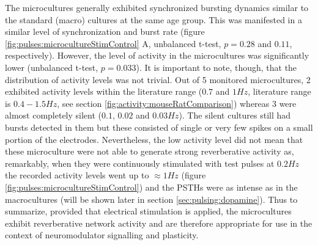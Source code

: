    The microcultures generally exhibited synchronized bursting dynamics similar to the standard (macro) cultures at the same age group. This was manifested in a similar level of synchronization and burst rate (figure \ref{fig:pulses:microcultureStimControl} A, unbalanced t-test, \(p=0.28\) and \(0.11\), respectively). However, the level of activity in the microcultures was significantly lower (unbalanced t-test, \(p=0.033\)). It is important to note, though, that the distribution of activity levels was not trivial. Out of 5 monitored microcultures, 2 exhibited activity levels within the literature range (\(0.7\) and \(1 Hz\), literature range is \(0.4-1.5Hz\), see section \ref{fig:activity:mouseRatComparison}) whereas 3 were almost completely silent (\(0.1\), \(0.02\) and \(0.03Hz\)). The silent cultures still had bursts detected in them but these consisted of single or very few spikes on a small portion of the electrodes. Nevertheless, the low activity level did not mean that these microculture were not able to generate strong reverberative activity as, remarkably, when they were continuously stimulated with test pulses at \(0.2Hz\) the recorded activity levels went up to \(\approx 1Hz\) (figure \ref{fig:pulses:microcultureStimControl}) and the PSTHs were as intense as in the macrocultures (will be shown later in section \ref{sec:pulsing:dopamine}). Thus to summarize, provided that electrical stimulation is applied, the microcultures exhibit reverberative network activity and are therefore appropriate for use in the context of neuromodulator signalling and plasticity.


